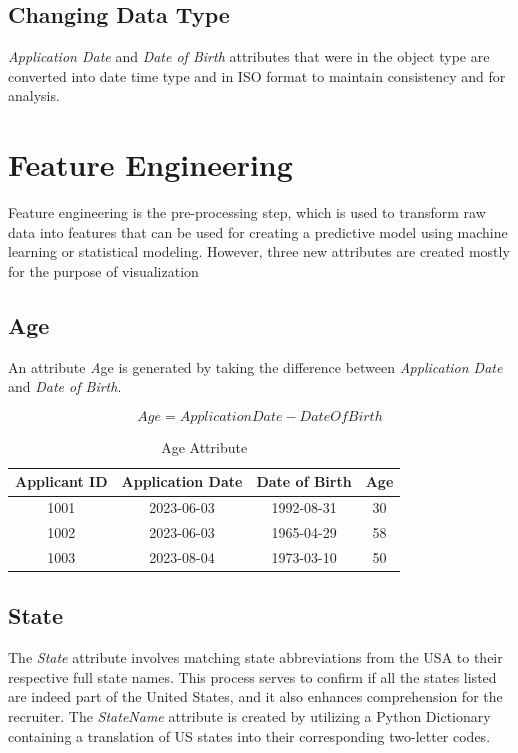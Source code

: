 \documentclass[journal]{IEEEtai}
\begin{document}
\subsection{Changing Data Type}
{\it Application Date} and {\it Date of Birth} attributes that were in the object type are converted into date time type and in ISO format to maintain consistency and for analysis.

\section{Feature Engineering}
Feature engineering is the pre-processing step, which is used to transform raw data into features that can be used for creating a predictive model using machine learning or statistical modeling. \cite{c} However, three new attributes are created mostly for the purpose of visualization

\subsection{Age}
An attribute {\textit Age} is generated by taking the difference between {\it Application Date} and {\it Date of Birth}.

$$
Age = ApplicationDate - DateOfBirth
$$

\begin{table}[htbp]
  \centering
  \caption{Age Attribute}
    \begin{tabular}{c c c c}
    \hline
    Applicant ID & Application Date & Date of Birth & Age \\
    \hline
    1001 & 2023-06-03 & 1992-08-31 & 30 \\
    1002 & 2023-06-03 & 1965-04-29 & 58 \\
    1003 & 2023-08-04 & 1973-03-10 & 50 \\
    \hline
  \end{tabular}
\end{table}


\subsection{State}
The {\it State} attribute involves matching state abbreviations from the USA to their respective full state names. This process serves to confirm if all the states listed are indeed part of the United States, and it also enhances comprehension for the recruiter. The {\it StateName} attribute is created by utilizing a Python Dictionary containing a translation of US states into their corresponding two-letter codes.
\end{document}

